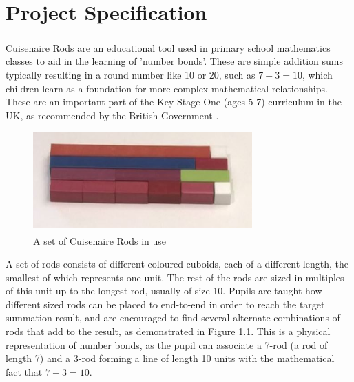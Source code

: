 \chapter{Project Specification}



Cuisenaire\textsuperscript{\textregistered} Rods \cite{TheCuise14:online} are an educational tool used in primary school mathematics classes to aid in the learning of 'number bonds'. These are simple addition sums typically resulting in a round number like 10 or 20, such as $7+3=10$, which children learn as a foundation for more complex mathematical relationships. These are an important part of the Key Stage One (ages 5-7) curriculum in the UK, as recommended by the British Government \cite{Mathemat26:online}. 

\begin{figure}[h] 
  \includegraphics[width=0.75\textwidth]{rods.JPG}
  \centering
  \caption{A set of Cuisenaire\textsuperscript{\textregistered} Rods in use \cite{24Lesnom77:online}}
  \label{fig:rods}
\end{figure}

A set of rods consists of different-coloured cuboids, each of a different length, the smallest of which represents one unit. The rest of the rods are sized in multiples of this unit up to the longest rod, usually of size 10. Pupils are taught how different sized rods can be placed to end-to-end in order to reach the target summation result, and are encouraged to find several alternate combinations of rods that add to the result, as demonstrated in Figure \ref{fig:rods}. This is a physical representation of number bonds, as the pupil can associate a 7-rod (a rod of length 7) and a 3-rod forming a line of length 10 units with the mathematical fact that $7+3=10$. \\

